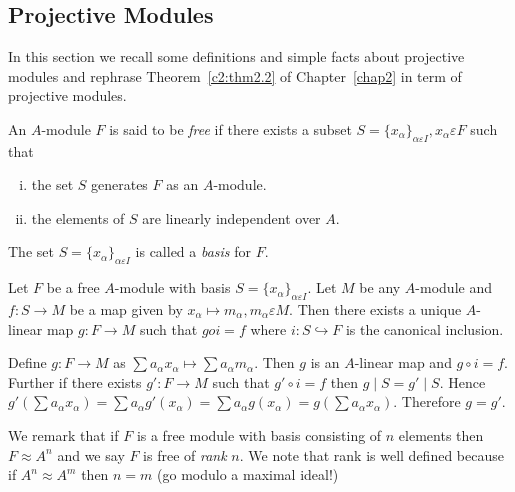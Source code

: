 \chapter{}\label{chap4}

\section{Projective Modules}\label{c4:s1}

In this section we recall some definitions and simple facts about
projective modules and rephrase Theorem~\ref{c2:thm2.2} of
Chapter~\ref{chap2} in term of projective modules.

\begin{dfn}\label{c4:dfn1.1}
An $A$-module $F$ is said to be \textit{free} if there exists a subset
$S=\{x_{\alpha}\}_{\alpha\varepsilon I},x_{\alpha}\varepsilon F$ such
that 
\begin{enumerate}[(i)]
\item the set $S$ generates $F$ as an $A$-module.
\item the elements of $S$ are linearly independent over $A$.
\end{enumerate}

The set $S=\{x_{\alpha}\}_{\alpha \varepsilon I}$ is called a
\textit{basis} for $F$.
\end{dfn}

\begin{Prop}\label{c4:Prop1.2}
Let $F$ be a free $A$-module with basis $S=\{x_{\alpha}\}_{\alpha
  \varepsilon I}$. Let $M$ be any $A$-module and $f:S\rightarrow M$ be
a map given by $x_{\alpha}\mapsto m_{\alpha},m_{\alpha}\varepsilon
M$. Then there exists a unique $A$-linear map $g:F\rightarrow M$ such
that $goi=f$ where $i:S\hookrightarrow F$ is the canonical inclusion.
\end{Prop}

\begin{Proof}
Define $g:F\rightarrow M$ as $\sum a_{\alpha}x_{\alpha}\mapsto \sum
a_{\alpha}m_{\alpha}$. Then $g$ is an $A$-linear map and
$g\circ i=f$. Further if there exists $g':F\rightarrow M$ such that
$g'\circ i=f$ then $g\mid S = g'\mid S$. Hence $g'\left(\sum
a_{\alpha}x_{\alpha}\right)=\sum a_{\alpha}g'(x_{\alpha})=\sum
a_{\alpha}g(x_{\alpha})=g\left(\sum a_{\alpha}x_{\alpha}\right)$. Therefore
$g=g'$. 

We remark that if $F$ is a free module with basis consisting of $n$
elements then $F\approx A^{n}$ and we say $F$ is free of \textit{rank} $n$. We
note that rank is well defined because if $A^{n}\approx A^{m}$ then
$n=m$ (go modulo a maximal ideal!)
\enprf
\end{Proof}

